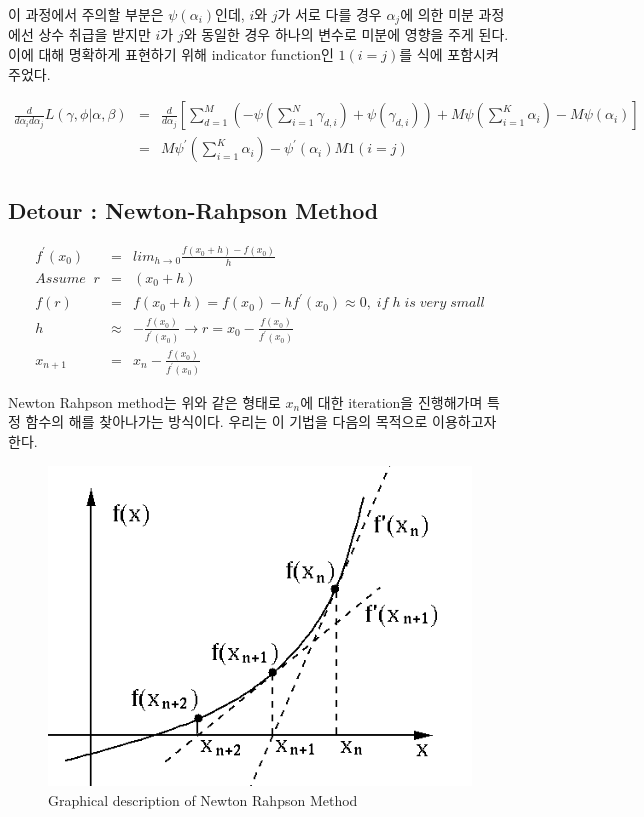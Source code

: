 \documentclass[draft=false]{oblivoir}
\begin{document}
이 과정에서 주의할 부분은 $\psi(\alpha_{i})$인데, $i$와 $j$가 서로 다를 경우 $\alpha_{j}$에 의한 미분 과정에선 상수 취급을 받지만 $i$가 $j$와 동일한 경우 하나의 변수로 미분에 영향을 주게 된다. 이에 대해 명확하게 표현하기 위해 indicator function인 $1(i=j)$를 식에 포함시켜 주었다. 

\begin{align}
\frac{d}{d\alpha_{i}d\alpha_{j}}L(\gamma,\phi|\alpha,\beta)\nonumber & = &
\frac{d}{d\alpha_{j}}[\sum^{M}_{d=1}(-\psi(\sum^{N}_{i=1}\gamma_{d,i})+\psi(\gamma_{d,i}))+M\psi(\sum^{K}_{i=1}\alpha_{i})-M\psi(\alpha_{i})]\nonumber\\
& = & M\psi^{'}(\sum^{K}_{i=1}\alpha_{i})-\psi^{'}(\alpha_{i})M1(i=j)
\end{align}

\subsection{Detour : Newton-Rahpson Method}
\begin{eqnarray}
f^{'}(x_{0}) & = & lim_{h \rightarrow 0}\frac{f(x_{0}+h)-f(x_{0})}{h}\nonumber \\
Assume \;\; r & = & (x_{0}+h)\nonumber \\
f(r) & = & f(x_{0}+h) = f(x_{0})-hf^{'}(x_{0}) \approx 0,\; if\; h \; is \; very \;small\nonumber \\
h &\approx& -\frac{f(x_{0})}{f^{'}(x_{0})} \rightarrow r = x_{0}-\frac{f(x_{0})}{f^{'}(x_{0})}\nonumber \\
x_{n+1} &=& x_{n}-\frac{f(x_{0})}{f^{'}(x_{0})}
\end{eqnarray}

Newton Rahpson method는 위와 같은 형태로 $x_{n}$에 대한 iteration을 진행해가며 특정 함수의 해를 찾아나가는 방식이다. 우리는 이 기법을 다음의 목적으로 이용하고자 한다.

\begin{figure}[ht] \centering 
\includegraphics[scale=0.4]{fig11_15.png} 
\caption{Graphical description of Newton Rahpson Method}
\label{fig:11-14}
\end{figure}
\end{document}
